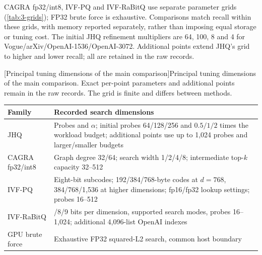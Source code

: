 CAGRA fp32/int8, IVF-PQ and IVF-RaBitQ \cite{cagra,pq,ivfrabitq}
use separate parameter grids (\cref{tab:3-grids}); FP32 brute force is
exhaustive. Comparisons match recall within these grids, with memory
reported separately, rather than imposing equal storage or tuning cost. The initial JHQ refinement multipliers are 64, 100, 8 and 4 for
Vogue/arXiv/OpenAI-1536/OpenAI-3072. Additional points extend JHQ's grid
to higher and lower recall; all are retained in the raw records.

\par\medskip\noindent\begin{minipage}{\linewidth}
\centering\captionsetup{hypcap=false}
[Principal tuning dimensions of the main comparison]{Principal tuning dimensions of the main comparison. Exact per-point parameters and
additional points remain in the raw records. The grid is finite and
differs between methods.}
\label{tab:3-grids}
\footnotesize\setlength{\tabcolsep}{4pt}
\begin{tabularx}{\linewidth}{@{}>{\raggedright\arraybackslash}p{.22\linewidth}>{\raggedright\arraybackslash}X@{}}
\toprule
Family & Recorded search dimensions \\
\midrule
JHQ & Probes and $\alpha$; initial probes 64/128/256 and
$0.5/1/2$ times the workload budget; additional points use up to
1,024 probes and larger/smaller budgets \\
CAGRA fp32/int8 & Graph degree 32/64; search width 1/2/4/8;
intermediate top-$k$ capacity 32--512 \\
IVF-PQ & Eight-bit subcodes; 192/384/768-byte codes at $d=768$,
384/768/1,536 at higher dimensions; fp16/fp32 lookup settings;
probes 16--512 \\
IVF-RaBitQ & 4/8/9 bits per dimension, supported search modes,
probes 16--1,024; additional 4,096-list OpenAI indexes \\
GPU brute force & Exhaustive FP32 squared-L2 search, common host boundary \\
\bottomrule
\end{tabularx}
\end{minipage}\par\medskip

